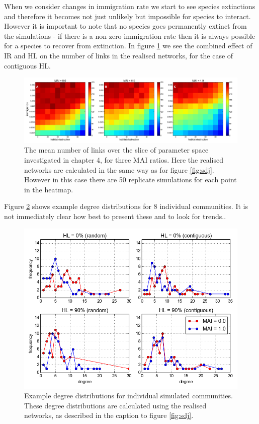 When we consider changes in immigration rate we start to see species extinctions and therefore it becomes not just unlikely but impossible for species to interact. However it is important to note that no species goes permanently extinct from the simulations - if there is a non-zero immigration rate then it is always possible for a species to recover from extinction. In figure \ref{fig:numlinks_heatmaps} we see the combined effect of IR and HL on the number of links in the realised networks, for the case of contiguous HL. 

\begin{figure}
	\centering
	\includegraphics[width=\textwidth]{"numlinks_ir_v_hl"}
	\caption{The mean number of links over the slice of parameter space investigated in chapter 4, for three MAI ratios. Here the realised networks are calculated in the same way as for figure \ref{fig:sdj}. However in this case there are 50 replicate simulations for each point in the heatmap.}
	\label{fig:numlinks_heatmaps}
\end{figure}


Figure \ref{fig:example_dd} shows example degree distributions for 8 individual communities. It is not immediately clear how best to present these and to look for trends..

\begin{figure}

	\centering
	\includegraphics[width=\textwidth]{"example_degree_distribution"}
	\caption{Example degree distributions for individual simulated communities. These degree distributions are calculated using the realised networks, as described in the caption to figure \ref{fig:sdj}.}
	\label{fig:example_dd}
\end{figure}


